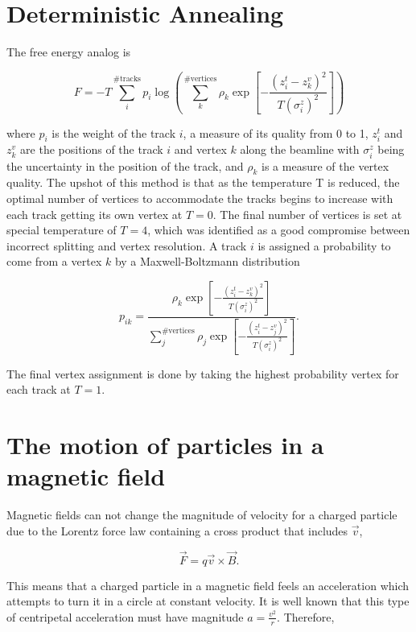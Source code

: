 
\appendix

\begingroup
\renewcommand{\cleardoublepage}{}
\renewcommand{\clearpage}{}
\chapter{Deterministic Annealing} \label{app:DA}
  The free energy analog is

  \[
    F = -T \sum \limits_i^{\text{\# tracks}} p_i \log \left( \sum \limits_k^{\text{\# vertices}} \rho_k \exp \left[ -\frac{\left(z_i^t - z_k^v\right)^2}{T (\sigma_i^z)^2} \right] \right)
  \]

  where $p_i$ is the weight of the track $i$, a measure of its quality from 0 to 1, $z_i^t$ and $z_k^v$ are the positions of the track $i$ and vertex $k$ along the beamline with $\sigma_i^z$ being the uncertainty in the position of the track, and $\rho_k$ is a measure of the vertex quality. The upshot of this method is that as the temperature T is reduced, the optimal number of vertices to accommodate the tracks begins to increase with each track getting its own vertex at $T=0$. The final number of vertices is set at special temperature of $T=4$, which  was identified as a good compromise between incorrect splitting and vertex resolution. A track $i$ is assigned a probability to come from a vertex $k$ by a Maxwell-Boltzmann distribution 

  \[ 
    p_{ik} = \frac{\rho_k \exp \left[ -\frac{\left(z_i^t - z_k^v\right)^2}{T (\sigma_i^z)^2} \right]} { \sum \limits_j^{\text{\# vertices}} \rho_{j} \exp \left[ -\frac{\left(z_i^t - z_j^v\right)^2}{T (\sigma_i^z)^2} \right]}. 
  \]

  The final vertex assignment is done by taking the highest probability vertex for each track at $T=1$.

\chapter{The motion of particles in a magnetic field} \label{app:sagitta}
\endgroup
  Magnetic fields can not change the magnitude of velocity for a charged particle due to the Lorentz force law containing a cross product that includes $\vec{v}$,

  \[
    \vec{F} = q\vec{v}\times\vec{B}.
  \]

  This means that a charged particle in a magnetic field feels an acceleration which attempts to turn it in a circle at constant velocity. It is well known that this type of centripetal acceleration must have magnitude $a = \frac{v^2}{r}$. Therefore, 

